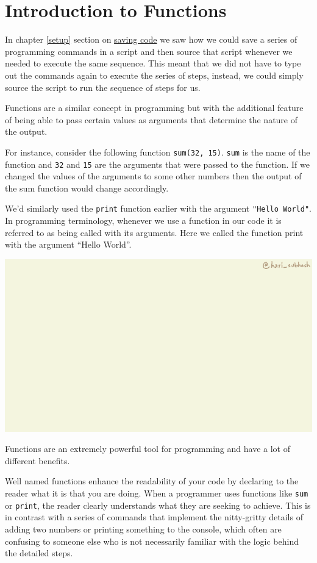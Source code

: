 \documentclass[
]{book}
\begin{document}
\hypertarget{functions-intro}{%
\chapter{Introduction to Functions}\label{functions-intro}}

In chapter \ref{setup} section on \protect\hyperlink{saving-code}{saving code} we saw how we could save a series of programming commands in a script and then source that script whenever we needed to execute the same sequence. This meant that we did not have to type out the commands again to execute the series of steps, instead, we could simply source the script to run the sequence of steps for us.

Functions are a similar concept in programming but with the additional feature of being able to pass certain values as arguments that determine the nature of the output.

For instance, consider the following function \texttt{sum(32,\ 15)}. \texttt{sum} is the name of the function and \texttt{32} and \texttt{15} are the arguments that were passed to the function. If we changed the values of the arguments to some other numbers then the output of the sum function would change accordingly.

We'd similarly used the \texttt{print} function earlier with the argument \texttt{"Hello\ World"}. In programming terminology, whenever we use a function in our code it is referred to as being called with its arguments. Here we called the function print with the argument ``Hello World''.

\includegraphics{assets/ch_3-functions/gifs/functions_syntax.gif}

Functions are an extremely powerful tool for programming and have a lot of different benefits.

Well named functions enhance the readability of your code by declaring to the reader what it is that you are doing. When a programmer uses functions like \texttt{sum} or \texttt{print}, the reader clearly understands what they are seeking to achieve. This is in contrast with a series of commands that implement the nitty-gritty details of adding two numbers or printing something to the console, which often are confusing to someone else who is not necessarily familiar with the logic behind the detailed steps.
\end{document}
